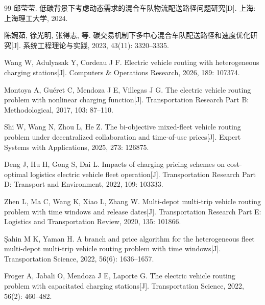 \documentclass{setp-new}
\begin{document}
\setcounter{section}{1}

\begin{thebibliography}{99}
 邱莹莹. 低碳背景下考虑动态需求的混合车队物流配送路径问题研究[D]. 上海: 上海理工大学, 2024.\par
{} 陈婉茹, 徐光明, 张得志, 等. 碳交易机制下多中心混合车队配送路径和速度优化研究[J]. 系统工程理论与实践, 2023, 43(11): 3320--3335.\par
{} Wang W, Adulyasak Y, Cordeau J F. Electric vehicle routing with heterogeneous charging stations[J]. Computers \& Operations Research, 2026, 189: 107374.\par
{} Montoya A, Guéret C, Mendoza J E, Villegas J G. The electric vehicle routing problem with nonlinear charging function[J]. Transportation Research Part B: Methodological, 2017, 103: 87--110.\par
{} Shi W, Wang N, Zhou L, He Z. The bi-objective mixed-fleet vehicle routing problem under decentralized collaboration and time-of-use prices[J]. Expert Systems with Applications, 2025, 273: 126875.\par
{} Deng J, Hu H, Gong S, Dai L. Impacts of charging pricing schemes on cost-optimal logistics electric vehicle fleet operation[J]. Transportation Research Part D: Transport and Environment, 2022, 109: 103333.\par
{} Zhen L, Ma C, Wang K, Xiao L, Zhang W. Multi-depot multi-trip vehicle routing problem with time windows and release dates[J]. Transportation Research Part E: Logistics and Transportation Review, 2020, 135: 101866.\par
{} Şahin M K, Yaman H. A branch and price algorithm for the heterogeneous fleet multi-depot multi-trip vehicle routing problem with time windows[J]. Transportation Science, 2022, 56(6): 1636--1657.\par
{} Froger A, Jabali O, Mendoza J E, Laporte G. The electric vehicle routing problem with capacitated charging stations[J]. Transportation Science, 2022, 56(2): 460--482.
\end{thebibliography}
\end{document}
